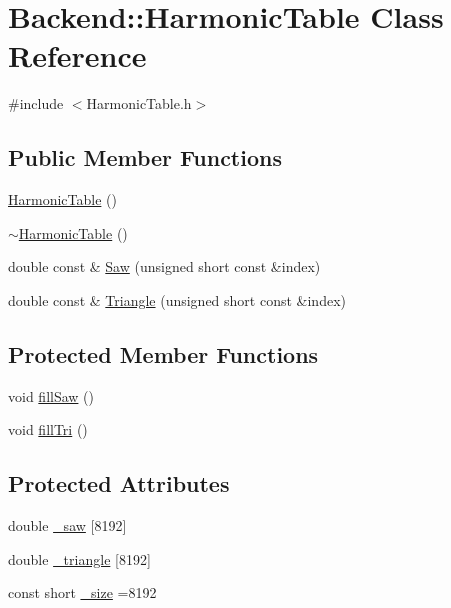 \hypertarget{classBackend_1_1HarmonicTable}{\section{Backend\+:\+:Harmonic\+Table Class Reference}
\label{classBackend_1_1HarmonicTable}
}


{\ttfamily \#include $<$Harmonic\+Table.\+h$>$}

\subsection*{Public Member Functions}
\begin{DoxyCompactItemize}
\item 
\hyperlink{classBackend_1_1HarmonicTable_a3ea23b72d602447940c3d97ba75e5902}{Harmonic\+Table} ()
\item 
\hyperlink{classBackend_1_1HarmonicTable_a1c3662131adb3c8e64d1ad1cd8a65a20}{$\sim$\+Harmonic\+Table} ()
\item 
double const \& \hyperlink{classBackend_1_1HarmonicTable_a6b7336f4f6184337350f282d5b0c5467}{Saw} (unsigned short const \&index)
\item 
double const \& \hyperlink{classBackend_1_1HarmonicTable_a97f9bbd2ba8612793776b2102f221c33}{Triangle} (unsigned short const \&index)
\end{DoxyCompactItemize}
\subsection*{Protected Member Functions}
\begin{DoxyCompactItemize}
\item 
void \hyperlink{classBackend_1_1HarmonicTable_a3b69fe79e5ddd9abfc13fc9a16de80c8}{fill\+Saw} ()
\item 
void \hyperlink{classBackend_1_1HarmonicTable_a581dd50f5e6502945e8b494cccab7244}{fill\+Tri} ()
\end{DoxyCompactItemize}
\subsection*{Protected Attributes}
\begin{DoxyCompactItemize}
\item 
double \hyperlink{classBackend_1_1HarmonicTable_a464db802494a562d2c9d0840ee6d1483}{\+\_\+saw} \mbox{[}8192\mbox{]}
\item 
double \hyperlink{classBackend_1_1HarmonicTable_a8e6fa80e2428d690a5716ae2815fd032}{\+\_\+triangle} \mbox{[}8192\mbox{]}
\item 
const short \hyperlink{classBackend_1_1HarmonicTable_a94c9f17b8fd4b514d145fbb8b0ed63dd}{\+\_\+size} =8192
\end{DoxyCompactItemize}


